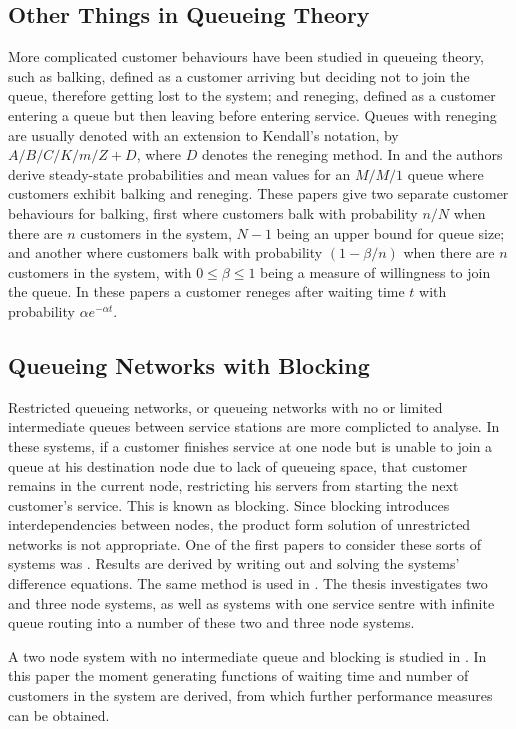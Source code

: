 \documentclass{article}
\begin{document}
\subsection{Other Things in Queueing Theory}
More complicated customer behaviours have been studied in queueing theory, such as balking, defined as a customer arriving but deciding not to join the queue, therefore getting lost to the system; and reneging, defined as a customer entering a queue but then leaving before entering service.
Queues with reneging are usually denoted with an extension to Kendall's notation, by $A/B/C/K/m/Z + D$, where $D$ denotes the reneging method.
In \cite{anckerjrgafarian63a} and \cite{anckerjrgafarian63b} the authors derive steady-state probabilities and mean values for an $M/M/1$ queue where customers exhibit balking and reneging.
These papers give two separate customer behaviours for balking, first where customers balk with probability $n/N$ when there are $n$ customers in the system, $N-1$ being an upper bound for queue size; and another where customers balk with probability $(1-\beta/n)$ when there are $n$ customers in the system, with $0\leq\beta\leq1$ being a measure of willingness to join the queue.
In these papers a customer reneges after waiting time $t$ with probability $\alpha e^{-\alpha t}$.

\subsection{Queueing Networks with Blocking}
Restricted queueing networks, or queueing networks with no or limited intermediate queues between service stations are more complicted to analyse.
In these systems, if a customer finishes service at one node but is unable to join a queue at his destination node due to lack of queueing space, that customer remains in the current node, restricting his servers from starting the next customer's service.
This is known as blocking.
Since blocking introduces interdependencies between nodes, the product form solution of unrestricted networks is not appropriate.
One of the first papers to consider these sorts of systems was \cite{hunt56}.
Results are derived by writing out and solving the systems' difference equations.
The same method is used in \cite{baber08}.
The thesis investigates two and three node systems, as well as systems with one service sentre with infinite queue routing into a number of these two and three node systems.

A two node system with no intermediate queue and blocking is studied in \cite{aviitzhakyadin65}.
In this paper the moment generating functions of waiting time and number of customers in the system are derived, from which further performance measures can be obtained.
\end{document}
